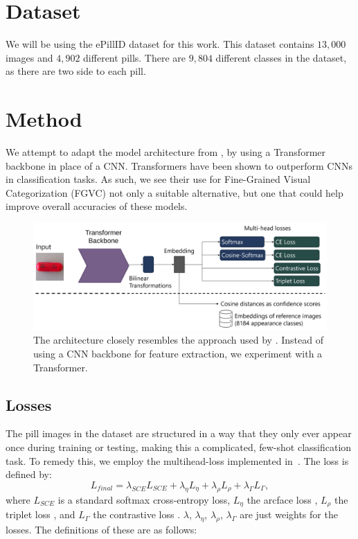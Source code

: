 \documentclass[10pt,twocolumn,letterpaper]{article}
\begin{document}
\section{Dataset}
We will be using the ePillID dataset \cite{ePill} for this work.  This dataset contains $13,000$ images and $4,902$ different pills.  There are $9,804$ different classes in the dataset, as there are two side to each pill.

\section{Method}
We attempt to adapt the model architecture from \cite{ePill}, by using a Transformer backbone in place of a CNN. 
Transformers have been shown to outperform CNNs in classification tasks. As such, we see their use for Fine-Grained Visual Categorization (FGVC) not only a suitable alternative, but one that could help improve overall accuracies of these models.

\begin{figure}[h]
    \centering
    \includegraphics[width=.5\textwidth]{transformer-head.png}
    \caption{The architecture closely resembles the approach used by \cite{repo}. Instead of using a CNN backbone for feature extraction, we experiment with a Transformer.}
    \label{fig:t_head}
\end{figure}

\subsection{Losses}
The pill images in the dataset are structured in a way that they only ever appear once during training or testing, making this a complicated, few-shot classification task. To remedy this, we employ the multihead-loss implemented in~\cite{ePill}.  The loss is defined by:
\begin{equation}
L_{final} = \lambda_{SCE}L_{SCE} + \lambda_\eta L_\eta + \lambda_\rho L_\rho + \lambda_\Gamma L_\Gamma,
\end{equation}
where $L_{SCE}$ is a standard softmax cross-entropy loss, $L_\eta$ the arcface loss \cite{arc}, $L_\rho$ the triplet loss \cite{triplet}, and $L_\Gamma$ the contrastive loss \cite{contrast}. 
$\lambda$, $\lambda_\eta$, $\lambda_\rho$, $\lambda_\Gamma$ are just weights for the losses. The definitions of these are as follows:
\end{document}
